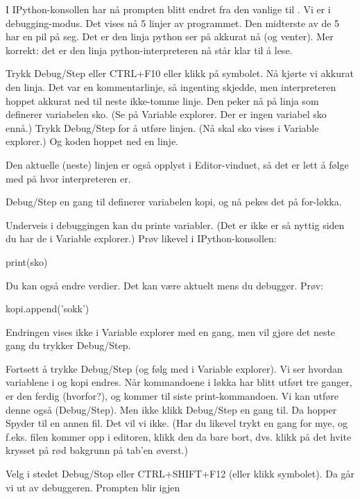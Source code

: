 I IPython-konsollen har nå prompten blitt endret fra den vanlige  til . Vi er i debugging-modus.  Det vises nå 5 linjer av programmet. Den midterste av de 5 har en pil på seg. Det er den linja python ser på akkurat nå (og venter). Mer korrekt: det er den linja python-interpreteren nå står klar til å lese.

Trykk Debug/Step eller CTRL+F10 eller klikk på symbolet. Nå kjørte vi akkurat den linja. Det var en kommentarlinje, så ingenting skjedde, men interpreteren hoppet akkurat ned til neste ikke-tomme linje. Den peker nå på linja som definerer variabelen sko. (Se på Variable explorer. Der er ingen variabel sko ennå.) Trykk Debug/Step for å utføre linjen. (Nå skal sko vises i Variable explorer.) Og koden hoppet ned en linje.

Den aktuelle (neste) linjen er også opplyst i Editor-vinduet, så det er lett å følge med på hvor interpreteren er. 

Debug/Step en gang til definerer variabelen kopi, og nå pekes det på for-løkka.

Underveis i debuggingen kan du printe variabler. (Det er ikke er så nyttig siden du har de i Variable explorer.) Prøv likevel i IPython-konsollen:
\begin{usncodebox}
print(sko)
\end{usncodebox}

Du kan også endre verdier. Det kan være aktuelt mens du debugger. Prøv:
\begin{usncodebox}
kopi.append('sokk')
\end{usncodebox}

Endringen vises ikke i Variable explorer med en gang, men vil gjøre det neste gang du trykker Debug/Step. 

Fortsett å trykke Debug/Step (og følg med i Variable explorer). Vi ser hvordan variablene i og kopi endres. Når kommandoene i løkka har blitt utført tre ganger, er den ferdig (hvorfor?), og kommer til siste print-kommandoen. Vi kan utføre denne også (Debug/Step). Men ikke klikk Debug/Step en gang til. Da hopper Spyder til en annen fil. Det vil vi ikke. (Har du likevel trykt en gang for mye, og f.eks. filen  kommer opp i editoren, klikk den da bare bort, dvs. klikk på det hvite krysset på rød bakgrunn på tab'en øverst.)

Velg i stedet Debug/Stop eller CTRL+SHIFT+F12 (eller klikk symbolet). Da går vi ut av debuggeren. Prompten blir igjen 

